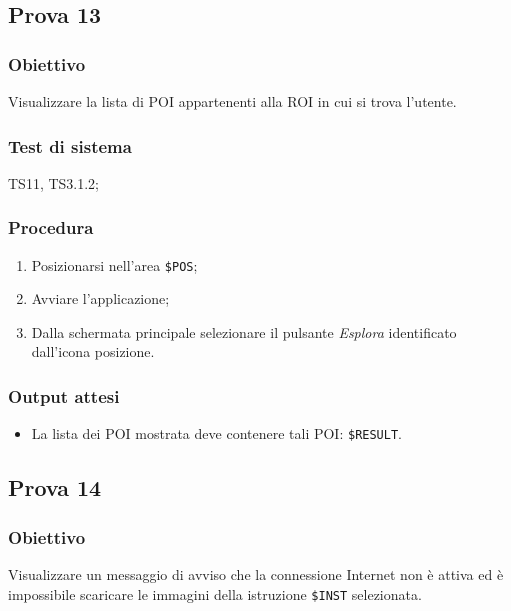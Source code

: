 \documentclass[../Sperimentazione.tex]{subfiles}
\begin{document}
	
\newpage	
\subsection{Prova 13} %
\label{subsec:Prova13}
	
	\subsubsection{Obiettivo}
		Visualizzare la lista di POI appartenenti alla ROI in cui si trova l'utente.
		
	\subsubsection{Test di sistema}
		TS11,
		TS3.1.2;
		
	\subsubsection{Procedura}
		\begin{enumerate}
		\item Posizionarsi nell'area \verb|$POS|;
		\item Avviare l'applicazione;
		\item Dalla schermata principale selezionare il pulsante \textit{Esplora} identificato dall'icona posizione. 
		\end{enumerate}
		
	\subsubsection{Output attesi}
		\begin{itemize}
		\item La lista dei POI mostrata deve contenere tali POI: \verb|$RESULT|.
		\end{itemize}
		
	
		
\newpage	
\subsection{Prova 14} %
\label{subsec:Prova14}
	
	\subsubsection{Obiettivo}
		Visualizzare un messaggio di avviso che la connessione Internet non è attiva ed è impossibile scaricare le immagini della istruzione  \verb|$INST| selezionata.
		
\end{document}
